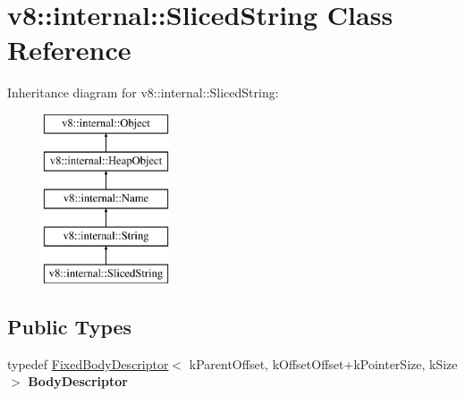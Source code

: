 \hypertarget{classv8_1_1internal_1_1_sliced_string}{}\section{v8\+:\+:internal\+:\+:Sliced\+String Class Reference}
\label{classv8_1_1internal_1_1_sliced_string}
Inheritance diagram for v8\+:\+:internal\+:\+:Sliced\+String\+:\begin{figure}[H]
\begin{center}
\leavevmode
\includegraphics[height=5.000000cm]{classv8_1_1internal_1_1_sliced_string}
\end{center}
\end{figure}
\subsection*{Public Types}
\begin{DoxyCompactItemize}
\item 
typedef \hyperlink{classv8_1_1internal_1_1_fixed_body_descriptor}{Fixed\+Body\+Descriptor}$<$ k\+Parent\+Offset, k\+Offset\+Offset+k\+Pointer\+Size, k\+Size $>$ {\bfseries Body\+Descriptor}\hypertarget{classv8_1_1internal_1_1_sliced_string_ac5dbb8e762551faed83b5bacbb93cc78}{}\label{classv8_1_1internal_1_1_sliced_string_ac5dbb8e762551faed83b5bacbb93cc78}

\end{DoxyCompactItemize}
